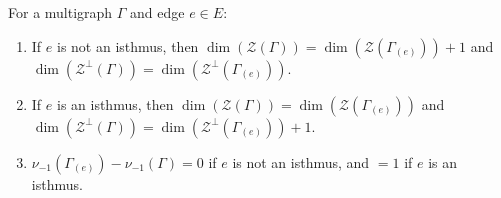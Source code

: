 For a multigraph $\Gamma$ and edge $e \in E$:
\begin{enumerate}
\item[(a)] If $e$ is not an isthmus, then $\dim(\mathcal{Z}(\Gamma)) = \dim(\mathcal{Z}(\Gamma_{(e)})) + 1$ and $\dim(\mathcal{Z}^\perp(\Gamma)) = \dim(\mathcal{Z}^\perp(\Gamma_{(e)}))$.
\item[(b)] If $e$ is an isthmus, then $\dim(\mathcal{Z}(\Gamma)) = \dim(\mathcal{Z}(\Gamma_{(e)}))$ and $\dim(\mathcal{Z}^\perp(\Gamma)) = \dim(\mathcal{Z}^\perp(\Gamma_{(e)})) + 1$.
\item[(c)] $\nu_{-1}(\Gamma_{(e)}) - \nu_{-1}(\Gamma) = 0$ if $e$ is not an isthmus, and $=1$ if $e$ is an isthmus.
\end{enumerate}